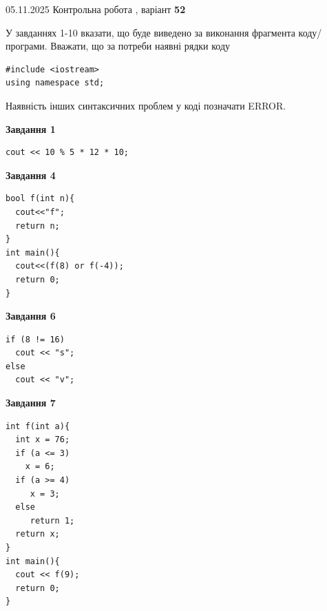 \documentclass[12pt, ukrainian]{article}
\begin{document}
{\Large{05.11.2025 Контрольна робота , варіант  \No \textbf { 52 }\par}}
{
\begin {large}
У завданнях 1-10 вказати, що буде виведено за виконання фрагмента коду/про\-гра\-ми.
Вважати, що за потреби наявні рядки коду
\begin{verbatim}
#include <iostream>
using namespace std;
\end{verbatim}
Наявність інших синтаксичних проблем у коді позначати ERROR.

\begin{minipage}[t]{7.0cm}

\begin{center}
\textbf{Завдання 1}
\end{center}
\vspace{-8mm}

\begin{verbatim}
cout << 10 % 5 * 12 * 10;
\end{verbatim}



\begin{center}
\textbf{Завдання 4}
\end{center}
\vspace{-8mm}

\begin{verbatim}
bool f(int n){
  cout<<"f";
  return n;
}
int main(){
  cout<<(f(8) or f(-4));
  return 0;
}
\end{verbatim}



\begin{center}
\textbf{Завдання 6}
\end{center}
\vspace{-8mm}

\begin{verbatim}
if (8 != 16)
  cout << "s";
else
  cout << "v";
\end{verbatim}



\begin{center}
\textbf{Завдання 7}
\end{center}
\vspace{-8mm}

\begin{verbatim}
int f(int a){
  int x = 76;
  if (a <= 3)
    x = 6;
  if (a >= 4)
     x = 3;
  else
     return 1;
  return x;
}
int main(){
  cout << f(9);
  return 0;
}
\end{verbatim}


\end{minipage}
\end{large}}
\end{document}
